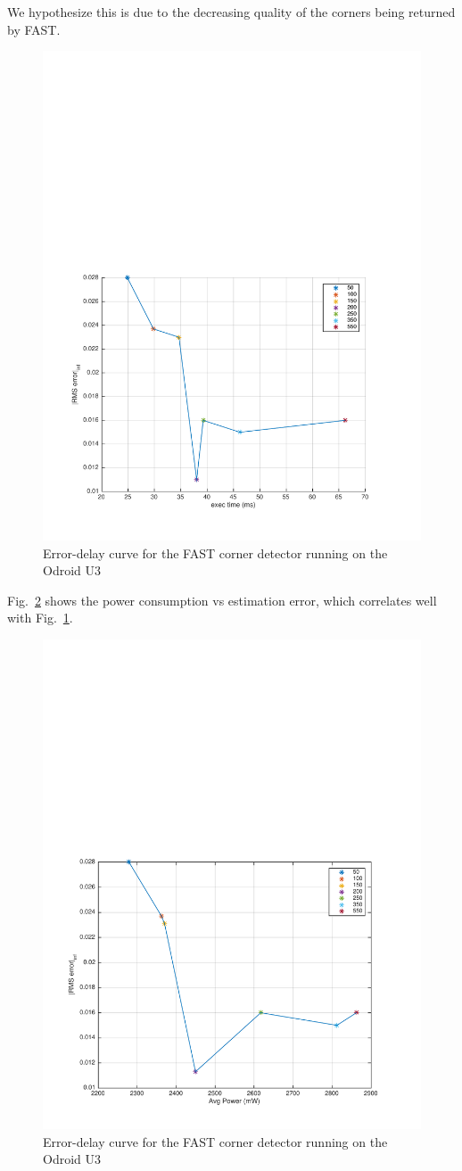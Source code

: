 We hypothesize this is due to the decreasing quality of the corners being returned by FAST.
\begin{figure}[t]
\centering
\includegraphics[width=0.7\linewidth]{figures/init_eps_delta_90th}
\caption{Error-delay curve for the FAST corner detector running on the Odroid U3}
\label{fig:fast}
\end{figure}

Fig.~\ref{fig:fastErrVsPower} shows the power consumption vs estimation error, which correlates well with Fig.~\ref{fig:fast}.
\begin{figure}[t]
	\centering
	\includegraphics[width=0.7\linewidth]{figures/errVsPower}
	\caption{Error-delay curve for the FAST corner detector running on the Odroid U3}
	\label{fig:fastErrVsPower}
\end{figure}